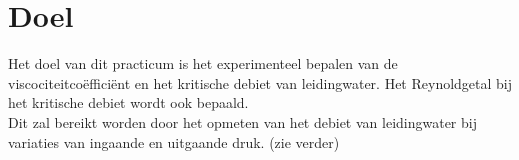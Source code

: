 \section{Doel}

Het doel van dit practicum is het experimenteel bepalen van de viscociteitco\"effici\"ent 
en het kritische debiet van leidingwater. Het Reynoldgetal bij het kritische debiet wordt ook bepaald.\\

Dit zal bereikt worden door het opmeten van het debiet van 
leidingwater bij variaties van ingaande en uitgaande 
druk. (zie verder)
